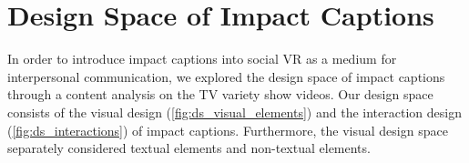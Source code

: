 \section{Design Space of Impact Captions}
\label{section_design_space}
In order to introduce impact captions into social VR as a medium for interpersonal communication, we explored the design space of impact captions through a content analysis on the TV variety show videos.
Our design space consists of the visual design (\autoref{fig:ds_visual_elements}) and the interaction design (\autoref{fig:ds_interactions}) of impact captions. 
Furthermore, the visual design space separately considered textual elements and non-textual elements.







